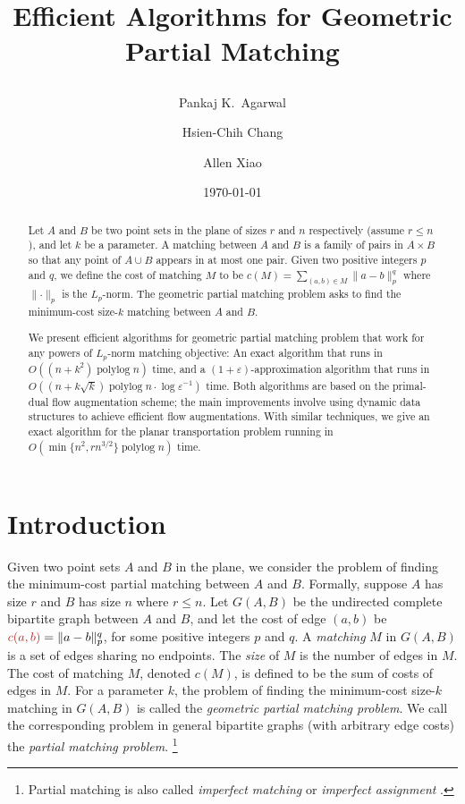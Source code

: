 \documentclass[11pt]{article}
\title{Efficient Algorithms for Geometric Partial Matching%
\date{\today} %
\author{
Pankaj K.\ Agarwal
\and
Hsien-Chih Chang
\and
Allen Xiao
}
}
\def\polylog{\mathop{\mathrm{polylog}}}
\def\eps{\varepsilon}
\def\norm#1{\mathopen\| #1 \mathclose\|}	%
\def\cost{c}
\theoremstyle{plain}
\numberwithin{figure}{section}
\def\EMPH#1{\textcolor{BrickRed}{{\emph{#1}}}}
\begin{document}
\maketitle

\begin{abstract}
Let $A$ and $B$ be two point sets in the plane of sizes $r$ and $n$ respectively (assume $r \leq n$), and let $k$ be a parameter.
A matching between $A$ and $B$ is a family of pairs in $A \times B$ so that any point of $A \cup B$ appears in at most one pair.
Given two positive integers $p$ and $q$, we define the cost of matching $M$ to be $\cost(M) = \sum_{(a, b) \in M}\norm{a-b}_p^q$ where $\norm{\cdot}_p$ is the $L_p$-norm.
The geometric partial matching problem asks to find the minimum-cost size-$k$ matching between $A$ and $B$.

We present efficient algorithms for geometric partial matching problem that work for any powers of $L_p$-norm matching objective:
An exact algorithm that runs in $O((n + k^2)\polylog n)$ time, and a $(1 + \eps)$-approximation algorithm that runs in $O((n + k\sqrt{k})\polylog n \cdot \log\eps^{-1})$ time.
Both algorithms are based on the primal-dual flow augmentation scheme; the main improvements involve using dynamic data structures to achieve efficient flow augmentations.
With similar techniques, we give an exact algorithm for the planar transportation problem running in $O(\min\{n^2, rn^{3/2}\}\polylog n)$ time.
\end{abstract}


\section{Introduction}

Given two point sets $A$ and $B$ in the plane, we consider the problem of finding
the minimum-cost partial matching between $A$ and $B$.
Formally, suppose $A$ has size $r$ and $B$ has size $n$ where $r \leq n$.
Let $G(A, B)$ be the undirected complete bipartite graph between
$A$ and $B$, and let the cost of edge $(a, b)$ be
$\EMPH{$c(a, b)$} = \norm{a-b}_p^q$, for some positive integers $p$ and $q$.
A \EMPH{matching} $M$ in $G(A, B)$ is a set of edges sharing no endpoints.
The \EMPH{size} of $M$ is the number of edges in $M$.
The cost of matching $M$, denoted \EMPH{$\cost(M)$}, is defined to be the sum of costs of edges in $M$.
For a parameter $k$, the problem of finding the minimum-cost
size-$k$ matching in $G(A, B)$ is called the \EMPH{geometric partial matching problem}.
We call the corresponding problem in general bipartite graphs (with arbitrary
edge costs) the \EMPH{partial matching problem}.%
\footnote{Partial matching is also called \EMPH{imperfect matching} or \EMPH{imperfect assignment} \cite{RT12,GHKT17}.}
\end{document}
